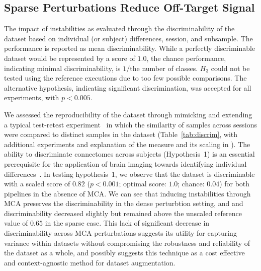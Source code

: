 \documentclass[fleqn,10pt]{SelfArx} %
\begin{document}
\subsection*{Sparse Perturbations Reduce Off-Target Signal}
\begin{table}[ht]\centering
\caption{The impact of instabilities as evaluated through the discriminability of the dataset based on individual (or
subject) differences, session, and subsample. The performance is reported as mean discriminability. While a perfectly
discriminable dataset would be represented by a score of $1.0$, the chance performance, indicating minimal discriminability, is
$1 /$the number of classes. $H_3$ could not be tested using the reference executions due to too few possible
comparisons. The alternative hypothesis, indicating significant discrimination, was accepted for all experiments, with
$p < 0.005$.}
\vspace{5pt}

\label{tab:discrim}
\end{table}

We assessed the reproducibility of the dataset through mimicking and extending a typical test-retest
experiment~\cite{bridgeford2020elim} in which the similarity of samples across sessions were
compared to distinct samples in the dataset (Table~\ref{tab:discrim}, with additional experiments and explanation of
the measure and its scaling in ). The ability to discriminate connectomes across subjects
(Hypothesis~1) is an essential prerequisite for the application of brain imaging towards identifying individual
differences~\cite{Dubois2016-yr}. In testing hypothesis~1, we observe that the dataset is discriminable with a scaled
score of $0.82$ ($p < 0.001$; optimal score: $1.0$; chance: $0.04$) for both pipelines in the absence of MCA. We can
see that inducing instabilities through MCA preserves the discriminability in the dense perturbtion setting, and
and discriminability decreased slightly but remained above the unscaled reference value of $0.65$ in the sparse case.
This lack of significant decrease in discriminability across MCA perturbations suggests its utility for capturing
variance within datasets without compromising the robustness and reliability of the dataset as a whole, and possibly
suggests this technique as a cost effective and context-agnostic method for dataset augmentation.
\end{document}
